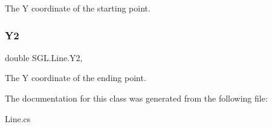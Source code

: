The Y coordinate of the starting point. 

\mbox{\label{class_s_g_l_1_1_line_af3571b932c09f78f70e288770e266341}} 
\subsubsection{\texorpdfstring{Y2}{Y2}}
{\footnotesize\ttfamily double S\+G\+L.\+Line.\+Y2\hspace{0.3cm}{\ttfamily [get]}, {\ttfamily [set]}}



The Y coordinate of the ending point. 



The documentation for this class was generated from the following file\+:\begin{DoxyCompactItemize}
\item 
Line.\+cs\end{DoxyCompactItemize}
